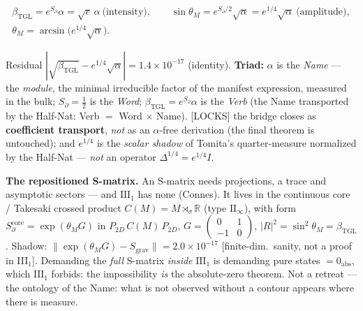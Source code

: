 \documentclass[11pt]{article}
\newcommand{\bTGL}{\beta_{\mathrm{TGL}}}\newcommand{\Msun}{M_{\odot}}\newcommand{\TGL}{\mathrm{TGL}}
\theoremstyle{definition}\newtheorem{deriv}{Derivation}
\begin{document}
\begin{equation}\begin{gathered}\bTGL=e^{S_\partial}\alpha=\sqrt e\,\alpha\ \text{(intensity)},\qquad \sin\theta_M=e^{S_\partial/2}\sqrt\alpha=e^{1/4}\sqrt\alpha\ \text{(amplitude)},\\ \theta_M=\arcsin\!\big(e^{1/4}\sqrt\alpha\big).\end{gathered}\end{equation}

Residual $|\sqrt{\bTGL}-e^{1/4}\sqrt\alpha|=1.4\times10^{-17}$ (identity). \textbf{Triad:} $\alpha$ is the \emph{Name} --- the \emph{module}, the minimal irreducible factor of the manifest expression, measured in the bulk; $S_\partial=\tfrac12$ is the \emph{Word}; $\bTGL=e^{S_\partial}\alpha$ is the \emph{Verb} (the Name transported by the Half-Nat: Verb $=$ Word $\times$ Name). \textsf{[LOCKS]} the bridge closes as \textbf{coefficient transport}, \emph{not} as an $\alpha$-free derivation (the final theorem is untouched); and $e^{1/4}$ is the \emph{scalar shadow} of Tomita's quarter-measure normalized by the Half-Nat --- \emph{not} an operator $\Delta^{1/4}=e^{1/4}I$.

\textbf{The repositioned S-matrix.} An S-matrix needs projections, a trace and asymptotic sectors --- and $\mathrm{III}_1$ has none (Connes). It lives in the continuous core / Takesaki crossed product $C(M)=M\rtimes_\sigma\mathbb R$ (type $\mathrm{II}_\infty$), with form $S_\partial^{\mathrm{core}}=\exp(\theta_M G)$ in $P_{2D}\,C(M)\,P_{2D}$, $G=\left(\begin{smallmatrix}0&1\\-1&0\end{smallmatrix}\right)$, $|R|^2=\sin^2\theta_M=\bTGL$. Shadow: $\|\exp(\theta_M G)-S_{\mathrm{grav}}\|=2.0\times10^{-17}$ \textsf{[finite-dim.\ sanity, not a proof in III$_1$]}. Demanding the \emph{full} S-matrix \emph{inside} $\mathrm{III}_1$ is demanding pure states $=0_{\mathrm{abs}}$, which $\mathrm{III}_1$ forbids: the impossibility \emph{is} the absolute-zero theorem. Not a retreat --- the ontology of the Name: what is not observed without a contour appears where there is measure.
\end{document}
